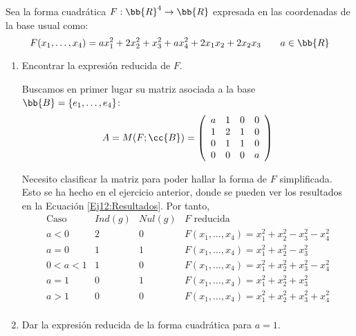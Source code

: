 \begin{ejercicio}
    Sea la forma cuadrática $F:\bb{R}^4\to \bb{R}$ expresada en las coordenadas de la base usual como:
    \begin{equation*}
        F(x_1,\dots,x_4) = ax_1^2+2x_2^2+x_3^2+ax_4^2 +2x_1x_2 + 2x_2x_3 \qquad a\in \bb{R}
    \end{equation*}

    \begin{enumerate}
        \item Encontrar la expresión reducida de $F$.

        Buscamos en primer lugar su matriz asociada a la base $\bb{B}=\{e_1,\dots,e_4\}$:
        \begin{equation*}
            A=M(F;\cc{B}) = \left( \begin{array}{cccc}
                a & 1 & 0 & 0 \\
                1 & 2 & 1 & 0 \\
                0 & 1 & 1 & 0 \\
                0 & 0 & 0 & a
            \end{array} \right)
        \end{equation*}
    
        Necesito clasificar la matriz para poder hallar la forma de $F$ simplificada. Esto se ha hecho en el ejercicio anterior, donde se pueden ver los resultados en la Ecuación \ref{Ej12:Resultados}. Por tanto,
        \begin{equation*}
            \begin{array}{c|c|c||l}
                \text{Caso} & Ind(g) & Nul(g) & F \text{ reducida} \\ \hline
                a < 0 & 2 & 0 & F(x_1,\dots,x_4)=x_1^2+x_2^2 -x_3^2-x_4^2\\
                a=0 & 1 & 1 & F(x_1, \dots, x_4) = x_1^2 + x_2^2 - x_3^2\\
                0 < a < 1 & 1 & 0 & F(x_1,\dots,x_4)=x_1^2+x_2^2 +x_3^2-x_4^2\\
                a=1 & 0 & 1 & F(x_1,\dots,x_4)=x_1^2+x_2^2 +x_3^2\\
                a > 1 & 0 & 0 & F(x_1,\dots,x_4)=x_1^2+x_2^2 +x_3^2+x_4^2\\           
            \end{array}
        \end{equation*} 

        \item Dar la expresión reducida de la forma cuadrática para $a=1$.


\end{enumerate}
\end{ejercicio}
